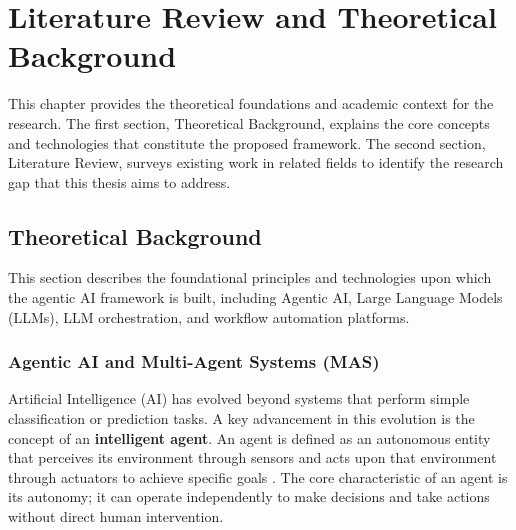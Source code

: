 \chapter{Literature Review and Theoretical Background}


This chapter provides the theoretical foundations and academic context for the research. The first section, Theoretical Background, explains the core concepts and technologies that constitute the proposed framework. The second section, Literature Review, surveys existing work in related fields to identify the research gap that this thesis aims to address.

\section{Theoretical Background}
\label{sec:theoretical_background}

This section describes the foundational principles and technologies upon which the agentic AI framework is built, including Agentic AI, Large Language Models (LLMs), LLM orchestration, and workflow automation platforms.

\subsection{Agentic AI and Multi-Agent Systems (MAS)}
\label{subsec:agentic_ai}

Artificial Intelligence (AI) has evolved beyond systems that perform simple classification or prediction tasks. A key advancement in this evolution is the concept of an \textbf{intelligent agent}. An agent is defined as an autonomous entity that perceives its environment through sensors and acts upon that environment through actuators to achieve specific goals \cite{FIND_CITATION_PLEASE}. The core characteristic of an agent is its autonomy; it can operate independently to make decisions and take actions without direct human intervention.

